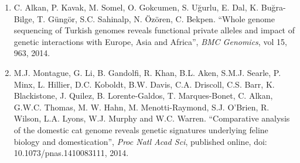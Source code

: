 \begin{enumerate}[i)]
\begin{enumerate}
\item C. Alkan, P. Kavak, M. Somel, O. Gokcumen, S. Uğurlu, E. Dal, K. Buğra-Bilge,  T. Güngör, S.C. Sahinalp, N. Özören, C. Bekpen. ``Whole genome sequencing of Turkish genomes reveals functional private alleles and impact of genetic interactions with Europe, Asia and Africa'', {\em BMC Genomics}, vol 15, 963, 2014.


\item M.J. Montague, G. Li, B. Gandolfi, R. Khan, B.L. Aken, S.M.J. Searle, P. Minx, L. Hillier, D.C. Koboldt, B.W. Davis, C.A. Driscoll, C.S. Barr, K. Blackistone, J. Quilez, B. Lorente-Galdos, T. Marques-Bonet, C. Alkan, G.W.C. Thomas, M. W. Hahn, M. Menotti-Raymond, S.J. O’Brien, R. Wilson, L.A. Lyons, W.J. Murphy and W.C. Warren. ``Comparative analysis of the domestic cat genome reveals genetic signatures underlying feline biology and domestication'', {\em Proc Natl Acad Sci}, published online, doi: 10.1073/pnas.1410083111, 2014.

\end{enumerate}


\end{enumerate}

